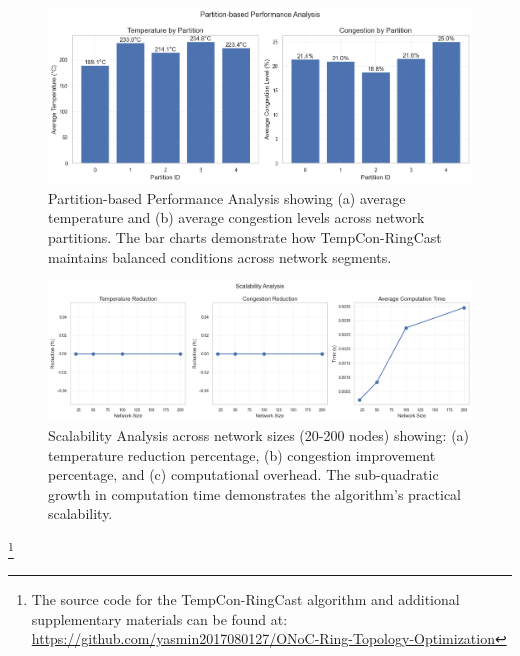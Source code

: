 \documentclass[conference]{IEEEtran}
\begin{document}
\begin{figure}[h]
    \centering
    \includegraphics[width=\linewidth]{partition_analysis.png}
    \caption{Partition-based Performance Analysis showing (a) average temperature and (b) average congestion levels across network partitions. The bar charts demonstrate how TempCon-RingCast maintains balanced conditions across network segments.}
    \label{fig:partition_analysis}
\end{figure}

\begin{figure}[h]
    \centering
    \includegraphics[width=\linewidth]{scalability.png}
    \caption{Scalability Analysis across network sizes (20-200 nodes) showing: (a) temperature reduction percentage, (b) congestion improvement percentage, and (c) computational overhead. The sub-quadratic growth in computation time demonstrates the algorithm's practical scalability.}
    \label{fig:scalability}
\end{figure}

\footnote{The source code for the TempCon-RingCast algorithm and additional supplementary materials can be found at: \href{https://github.com/yasmin2017080127/ONoC-Ring-Topology-Optimization}{https://github.com/yasmin2017080127/ONoC-Ring-Topology-Optimization}}

\nocite{*}



\end{document}
